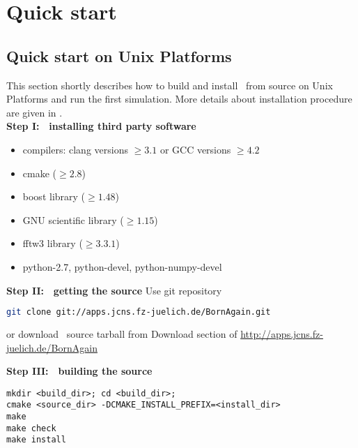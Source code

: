 \newpage
\chapter{Quick start} 

\section{Quick start on Unix Platforms}

This section shortly describes how to build and install \BornAgain\ 
from source on Unix Platforms  and run the first simulation. 
More details about installation procedure are given in . \\

\noindent
{\bf Step I: $~$ installing third party software}
\begin{itemize}
\item compilers: clang  versions $\geq 3.1$ or GCC versions $\geq 4.2$
\item cmake ($\geq 2.8$)
\item boost library ($\geq 1.48$)
\item GNU scientific library ($\geq 1.15$)
\item fftw3 library ($\geq 3.3.1$)
\item python-2.7, python-devel, python-numpy-devel
\end{itemize}
\vspace*{2mm}


\noindent
{\bf Step II: $~$ getting the source} \newline
Use git repository
\begin{lstlisting}[language=bash, style=commandline]
git clone git://apps.jcns.fz-juelich.de/BornAgain.git 
\end{lstlisting}
or download \BornAgain\ source tarball from Download section of \url{http://apps.jcns.fz-juelich.de/BornAgain}

\vspace*{3mm}



\noindent
{\bf Step III: $~$ building the source}
\begin{lstlisting}[language=shell, style=commandline]
mkdir <build_dir>; cd <build_dir>;
cmake <source_dir> -DCMAKE_INSTALL_PREFIX=<install_dir>
make
make check
make install
\end{lstlisting}
\vspace*{3mm}



